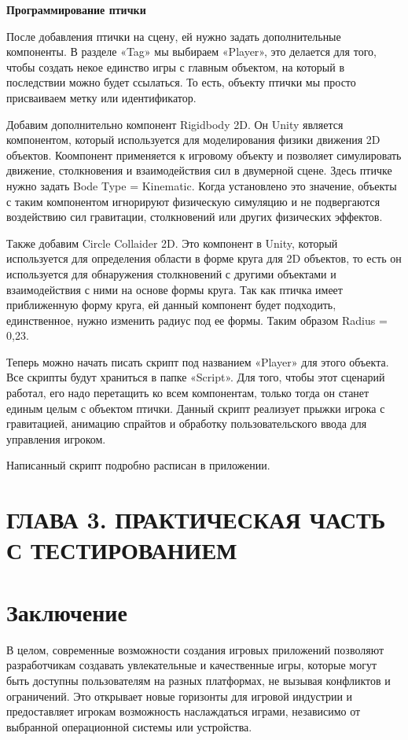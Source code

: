 \documentclass[14pt, oneside]{altsu-report}
\begin{document}
\textbf{Программирование птички}

После добавления птички на сцену, ей нужно задать дополнительные компоненты. В разделе «Tag» мы выбираем «Player», это делается для того, чтобы создать некое единство игры с главным объектом, на который в последствии можно будет ссылаться. То есть, объекту птички мы просто присваиваем метку или идентификатор.

Добавим дополнительно компонент Rigidbody 2D. Он Unity является компонентом, который используется для моделирования физики движения 2D объектов. Коомпонент применяется к игровому объекту и позволяет симулировать движение, столкновения и взаимодействия сил в двумерной сцене. Здесь птичке нужно задать Bode Type = Kinematic. Когда установлено это значение, объекты с таким компонентом игнорируют физическую симуляцию и не подвергаются воздействию сил гравитации, столкновений или других физических эффектов.

Также добавим Circle Collaider 2D. Это компонент в Unity, который используется для определения области в форме круга для 2D объектов, то есть он используется для обнаружения столкновений с другими объектами и взаимодействия с ними на основе формы круга. Так как птичка имеет приближенную форму круга, ей данный компонент будет подходить, единственное, нужно изменить радиус под ее формы. Таким образом Radius = 0,23.

Теперь можно начать писать скрипт под названием «Player» для этого объекта. Все скрипты будут храниться в папке «Script». Для того, чтобы этот сценарий работал, его надо перетащить ко всем компонентам, только тогда он станет единым целым с объектом птички. Данный скрипт реализует прыжки игрока с гравитацией, анимацию спрайтов и обработку пользовательского ввода для управления игроком. 

Написанный скрипт подробно расписан в приложении.


\chapter{ГЛАВА 3. ПРАКТИЧЕСКАЯ ЧАСТЬ С ТЕСТИРОВАНИЕМ}

\chapter*{Заключение}

В целом, современные возможности создания игровых приложений позволяют разработчикам создавать увлекательные и качественные игры, которые могут быть доступны пользователям на разных платформах, не вызывая конфликтов и ограничений. Это открывает новые горизонты для игровой индустрии и предоставляет игрокам возможность наслаждаться играми, независимо от выбранной операционной системы или устройства.
\end{document}
